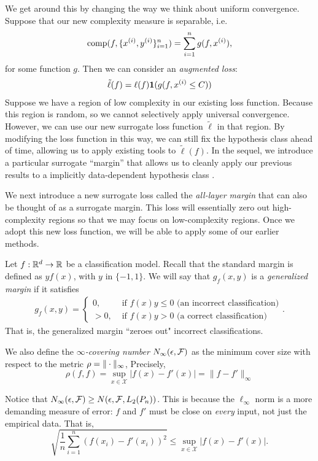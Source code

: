We get around this by changing the way we think about uniform convergence. Suppose that our new complexity measure is separable, i.e.
\begin{align}
    \text{comp}(f, \{x\sp{i}, y\sp{i}\}_{i=1}^n) = \sum_{i=1}^n g(f, x\sp{i}),
\end{align}
for some function $g$. Then we can consider an \textit{augmented loss}:
\begin{align}
    \tilde{\ell}(f) = \ell(f) \mathbf{1}(g(f, x\sp{i} \leq C))
\end{align}
Suppose we have a region of low complexity in our existing loss function. Because this region is random, so we cannot selectively apply universal convergence. However, we can use our new surrogate loss function $\tilde{\ell}$ in that region. By modifying the loss function in this way, we can still fix the hypothesis class ahead of time, allowing us to apply existing tools to $\tilde{\ell}(f)$. In the sequel, we introduce a particular surrogate ``margin'' that allows us to cleanly apply our previous results to a implicitly data-dependent hypothesis class \cite{wei2019data}.

We next introduce a new surrogate loss called the \textit{all-layer margin} that can also be thought of as a surrogate margin. This loss will essentially zero out high-complexity regions so that we may focus on low-complexity regions. Once we adopt this new loss function, we will be able to apply some of our earlier methods.

Let $f: \R^d \to \R$ be a classification model. Recall that the standard margin is defined as $y f(x)$, with $y$ in $\{-1, 1\}$. We will say that $g_f(x, y)$ is a \textit{generalized margin} if it satisfies
\begin{align}
    g_f(x, y) = \begin{cases}
0,& \text{ if } f(x)y \leq 0 \text{ (an incorrect classification)}\\
> 0,& \text{ if } f(x)y > 0 \text{ (a correct classification)}
\end{cases}.
\end{align}
That is, the generalized margin ``zeroes out" incorrect classifications.

We also define the \textit{$\infty$-covering number} $N_\infty(\epsilon, \cF)$ as the minimum cover size with respect to the metric $\rho = \norm{\cdot}_\infty$, Precisely,
\begin{equation}
\rho(f, f) = \sup_{x \in \mathcal{X}} |f(x) - f'(x)| = \|f - f'\|_\infty
\end{equation}
\begin{remark}
    Notice that $N_\infty(\epsilon, \cF) \geq N(\epsilon, \cF, L_2(P_n))$. This is because the $\ell_\infty$ norm is a more demanding measure of error: $f$ and $f'$ must be close on \textit{every} input, not just the empirical data. That is,
    \begin{equation}
    \sqrt{\frac{1}{n} \sum_{i=1}^n (f(x_i) - f'(x_i))^2} \leq \sup_{x \in \mathcal{X}} |f(x) - f'(x)|.
    \end{equation}
\end{remark}

